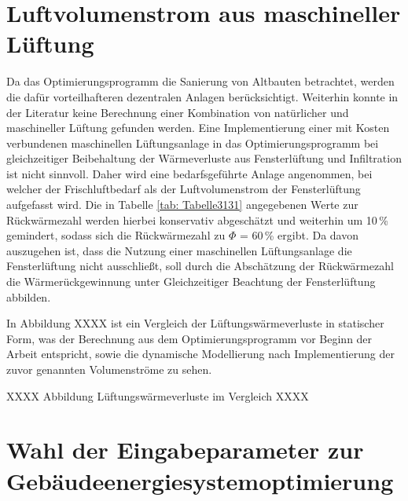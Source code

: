 \section*{Luftvolumenstrom aus maschineller Lüftung}

Da das Optimierungsprogramm die Sanierung von Altbauten betrachtet, werden die dafür vorteilhafteren dezentralen Anlagen berücksichtigt.
Weiterhin konnte in der Literatur keine Berechnung einer Kombination von natürlicher und maschineller Lüftung gefunden werden.
Eine Implementierung einer mit Kosten verbundenen maschinellen Lüftungsanlage in das Optimierungsprogramm bei gleichzeitiger Beibehaltung der Wärmeverluste aus Fensterlüftung und Infiltration ist nicht sinnvoll.
Daher wird eine bedarfsgeführte Anlage angenommen, bei welcher der Frischluftbedarf als der Luftvolumenstrom der Fensterlüftung aufgefasst wird.
Die in Tabelle \ref{tab: Tabelle3131} angegebenen Werte zur Rückwärmezahl werden hierbei konservativ abgeschätzt und weiterhin um 10\,\% gemindert, sodass sich die Rückwärmezahl zu \(\Phi\) = 60\,\%  ergibt.
Da davon auszugehen ist, dass die Nutzung einer maschinellen Lüftungsanlage die Fensterlüftung nicht ausschließt, soll durch die Abschätzung der Rückwärmezahl die Wärmerückgewinnung unter Gleichzeitiger Beachtung der Fensterlüftung abbilden.

In Abbildung XXXX ist ein Vergleich der Lüftungswärmeverluste in statischer Form, was der Berechnung aus dem Optimierungsprogramm vor Beginn der Arbeit entspricht, sowie die dynamische Modellierung nach Implementierung der zuvor genannten Volumenströme zu sehen.

XXXX Abbildung Lüftungswärmeverluste im Vergleich XXXX

\section{Wahl der Eingabeparameter zur Gebäudeenergiesystemoptimierung}
\label{sec:Sektion 52}

